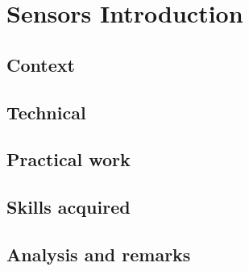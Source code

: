 \section{Sensors Introduction}
\subsection{Context}
\subsection{Technical}
\subsection{Practical work}
\subsection{Skills acquired}
\subsection{Analysis and remarks}